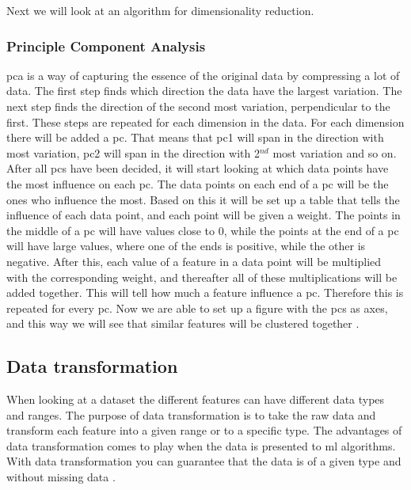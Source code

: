 \documentclass[english, a4paper]{report}
\begin{document}
{{{            Next we will look at an algorithm for dimensionality reduction.  
        
            \subsubsection{Principle Component Analysis}\label{PCA}
            {
                \gls{pca} is a way of capturing the essence of the original data by compressing a lot of data. The first step finds which direction the data have the largest variation. The next step finds the direction of the second most variation, perpendicular to the first. These steps are repeated for each dimension in the data. For each dimension there will be added a \gls{pc}. That means that \gls{pc}1 will span in the direction with most variation, \gls{pc}2 will span in the direction with 2$^{nd}$ most variation and so on. \\
                After all \gls{pc}s have been decided, it will start looking at which data points have the most influence on each \gls{pc}. The data points on each end of a \gls{pc} will be the ones who influence the most. Based on this it will be set up a table that tells the influence of each data point, and each point will be given a weight. The points in the middle of a \gls{pc} will have values close to 0, while the points at the end of a \gls{pc} will have large values, where one of the ends is positive, while the other is negative. After this, each value of a feature in a data point will be multiplied with the corresponding weight, and thereafter all of these multiplications will be added together. This will tell how much a feature influence a \gls{pc}. Therefore this is repeated for every \gls{pc}. Now we are able to set up a figure with the \gls{pc}s as axes, and this way we will see that similar features will be clustered together \cite{mlMarsland}. 
            }
        }
        
        \subsection{Data transformation} \label{data-transformation-theory}
        {
            When looking at a dataset the different features can have different data types and ranges. The purpose of data transformation is to take the raw data and transform each feature into a given range or to a specific type. The advantages of data transformation comes to play when the data is presented to \gls{ml} algorithms. With data transformation you can guarantee that the data is of a given type and without missing data \cite{dataTransformation}. 
            
}}}
\end{document}
